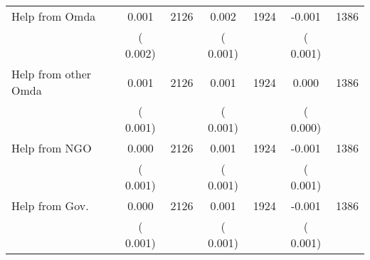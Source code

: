 \begin{tabular}{l*{6}{c}}
Help from Omda        &              0.001      &       2126       &              0.002      &       1924       &             -0.001      &       1386       \\
                       &       (       0.002)            &                               &       (       0.001)            &                               &       (       0.001)            &                               \\
Help from other Omda        &              0.001      &       2126       &              0.001      &       1924       &              0.000      &       1386       \\
                       &       (       0.001)            &                               &       (       0.001)            &                               &       (       0.000)            &                               \\
Help from NGO        &              0.000      &       2126       &              0.001      &       1924       &             -0.001      &       1386       \\
                       &       (       0.001)            &                               &       (       0.001)            &                               &       (       0.001)            &                               \\
Help from Gov.        &              0.000      &       2126       &              0.001      &       1924       &             -0.001      &       1386       \\
                       &       (       0.001)            &                               &       (       0.001)            &                               &       (       0.001)            &                               \\
\hline \end{tabular}
